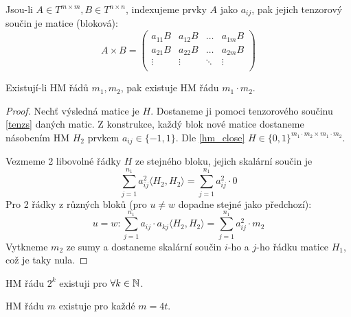 \begin{definition}\label{tenzs}
	Jsou-li $A\in T^{m\times m}, B\in T^{n\times n}$, indexujeme prvky $A$ jako $a_{ij}$, pak jejich tenzorový součin je matice (bloková):
    \[
        A\times B=\begin{pmatrix}
            a_{11}B & a_{12}B & \ldots & a_{1m}B\\
            a_{21}B & a_{22}B & \ldots & a_{2m}B\\
            \vdots  & \vdots  & \ddots & \vdots\\
        \end{pmatrix}
    \]
\end{definition}

\begin{theorem}\label{hm_komb}
    Existují-li HM řádů $m_1,m_2$, pak existuje HM řádu $m_1\cdot m_2$.
\end{theorem}
\begin{proof}
	Nechť výsledná matice je $H$.
	Dostaneme ji pomoci tenzorového součinu \cref{tenzs} daných matic.
	Z konstrukce, každý blok nové matice dostaneme násobením HM $H_2$ prvkem $a_{ij} \in \{ -1, 1 \}$.
	Dle \cref{hm_close} $H \in \{ 0, 1 \}^{m_1 \cdot m_2 \times m_1 \cdot m_2}$.

	Vezmeme 2 libovolné řádky $H$ ze stejného bloku, jejich skalární součin je
	\[ \sum_{j = 1}^{n_1} a_{ij}^2 \langle H_2, H_2 \rangle = \sum_{j = 1}^{n_1} a_{ij}^2 \cdot 0 \]
	Pro 2 řádky z různých bloků (pro $u \ne w$ dopadne stejné jako předchozí):
	\[ u = w: \sum_{j = 1}^{n_1} a_{ij} \cdot a_{kj} \langle H_2, H_2 \rangle = \sum_{j = 1}^{n_1} a_{ij}^2 \cdot m_2 \]
	Vytkneme $m_2$ ze sumy a dostaneme skalární součin $i$-ho a $j$-ho řádku matice $H_1$, což je taky nula.
\end{proof}

\begin{consequence}[Sylvester]\label{sylv_cons}
	HM řádu $2^k$ existuji pro $\forall k \in \operatorname{\mathbb{N}}$.
\end{consequence}

\begin{conj}[Hadamard]
	HM řádu $m$ existuje pro každé $m = 4t$.
\end{conj}


